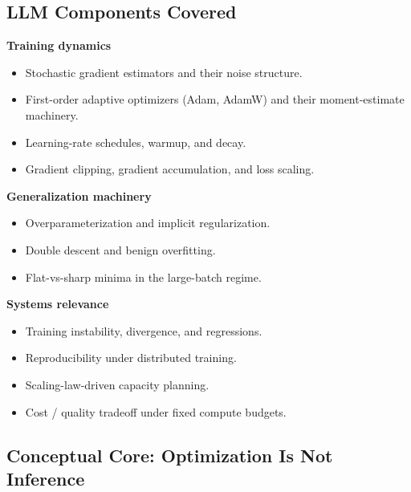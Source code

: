 \subsection{LLM Components Covered}

\textbf{Training dynamics}
\begin{itemize}
  \item Stochastic gradient estimators and their noise structure.
  \item First-order adaptive optimizers (Adam, AdamW) and their
        moment-estimate machinery.
  \item Learning-rate schedules, warmup, and decay.
  \item Gradient clipping, gradient accumulation, and loss scaling.
\end{itemize}

\textbf{Generalization machinery}
\begin{itemize}
  \item Overparameterization and implicit regularization.
  \item Double descent and benign overfitting.
  \item Flat-vs-sharp minima in the large-batch regime.
\end{itemize}

\textbf{Systems relevance}
\begin{itemize}
  \item Training instability, divergence, and regressions.
  \item Reproducibility under distributed training.
  \item Scaling-law-driven capacity planning.
  \item Cost / quality tradeoff under fixed compute budgets.
\end{itemize}

\subsection{Conceptual Core: Optimization Is Not Inference}

